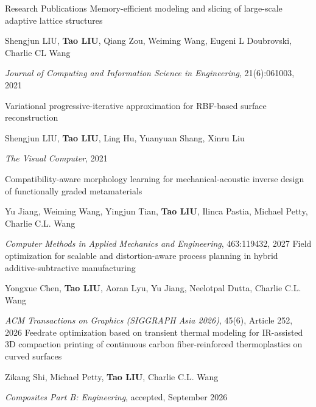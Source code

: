 \begin{rubric}{Research Publications}
\entry*[]
	[11] Memory-efficient modeling and slicing of large-scale adaptive lattice structures
	\par Shengjun LIU, \textbf{Tao LIU}, Qiang Zou, Weiming Wang, Eugeni L Doubrovski, Charlie CL Wang
	\par \textit{Journal of Computing and Information Science in Engineering}, 21(6):061003, 2021

\entry*[]
	[10] Variational progressive-iterative approximation for RBF-based surface reconstruction
	\par Shengjun LIU, \textbf{Tao LIU}, Ling Hu, Yuanyuan Shang, Xinru Liu
	\par \textit{The Visual Computer}, 2021

\entry*[]
	[9] Compatibility-aware morphology learning for mechanical-acoustic inverse design of functionally graded metamaterials
	\par Yu Jiang, Weiming Wang, Yingjun Tian, \textbf{Tao LIU}, Ilinca Pastia, Michael Petty, Charlie C.L. Wang
	\par \textit{Computer Methods in Applied Mechanics and Engineering}, 463:119432, 2027
%
\entry*[]
	[8] Field optimization for scalable and distortion-aware process planning in hybrid additive-subtractive manufacturing
	\par Yongxue Chen, \textbf{Tao LIU}, Aoran Lyu, Yu Jiang, Neelotpal Dutta, Charlie C.L. Wang
	\par \textit{ACM Transactions on Graphics (SIGGRAPH Asia 2026)}, 45(6), Article 252, 2026
%
\entry*[]
	[7] Feedrate optimization based on transient thermal modeling for IR-assisted 3D compaction printing of continuous carbon fiber-reinforced thermoplastics on curved surfaces
	\par Zikang Shi, Michael Petty, \textbf{Tao LIU}, Charlie C.L. Wang
	\par \textit{Composites Part B: Engineering}, accepted, September 2026
%


\end{rubric}
